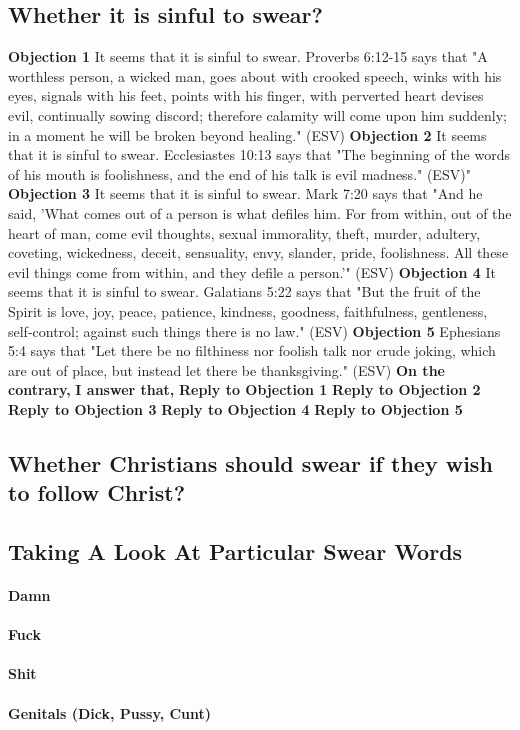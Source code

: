 \documentclass[a4paper, parskip=full, 12pt]{article}
\begin{document}
\subsection{Whether it is sinful to swear?}
\textbf{Objection 1} It seems that it is sinful to swear. Proverbs 6:12-15 says that "A worthless person, a wicked man, goes about with crooked speech, winks with his eyes, signals with his feet, points with his finger, with perverted heart devises evil, continually sowing discord; therefore calamity will come upon him suddenly; in a moment he will be broken beyond healing." (ESV)
\textbf{Objection 2} It seems that it is sinful to swear. Ecclesiastes 10:13 says that "The beginning of the words of his mouth is foolishness, and the end of his talk is evil madness." (ESV)"
\textbf{Objection 3} It seems that it is sinful to swear. Mark 7:20 says that "And he said, 'What comes out of a person is what defiles him. For from within, out of the heart of man, come evil thoughts, sexual immorality, theft, murder, adultery, coveting, wickedness, deceit, sensuality, envy, slander, pride, foolishness. All these evil things come from within, and they defile a person.'" (ESV)
\textbf{Objection 4} It seems that it is sinful to swear. Galatians 5:22 says that "But the fruit of the Spirit is love, joy, peace, patience, kindness, goodness, faithfulness, gentleness, self-control; against such things there is no law." (ESV)
\textbf{Objection 5} Ephesians 5:4 says that "Let there be no filthiness nor foolish talk nor crude joking, which are out of place, but instead let there be thanksgiving." (ESV)
\textbf{On the contrary,}
\textbf{I answer that,}
\textbf{Reply to Objection 1}
\textbf{Reply to Objection 2}
\textbf{Reply to Objection 3}
\textbf{Reply to Objection 4}
\textbf{Reply to Objection 5}

\subsection{Whether Christians should swear if they wish to follow Christ?}
\subsection{Taking A Look At Particular Swear Words}
\paragraph{Damn}
\paragraph{Fuck}
\paragraph{Shit}
\paragraph{Genitals (Dick, Pussy, Cunt)}
\end{document}
